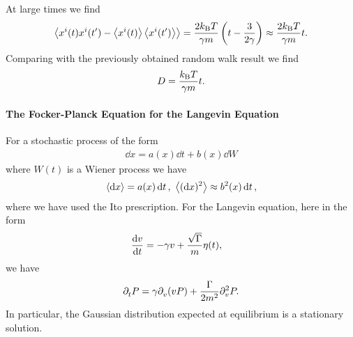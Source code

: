 At large times we find
\begin{align*}
	\expval{x^{i}(t)x^{i}(t\ensuremath{^{\prime}}) - \expval{x^{i}(t)}\expval{x^{i}(t\ensuremath{^{\prime}})}} = \frac{2k_{\text{B}} T}{\gamma m}\left(t - \frac{3}{2\gamma}\right) \approx \frac{2k_{\text{B}} T}{\gamma m}t.
\end{align*}
Comparing with the previously obtained random walk result we find
\begin{align*}
	D = \frac{k_{\text{B}} T}{\gamma m}t.
\end{align*}

\paragraph{The Focker-Planck Equation for the Langevin Equation}
For a stochastic process of the form
\begin{align*}
	\dd{x} = a(x)\dd{t} + b(x)\dd{W}
\end{align*}
where $W(t)$ is a Wiener process we have
\begin{align*}
	\expval{\dd{x}} = a(x)\dd{t},\ \expval{(\dd{x})^{2}} \approx b^{2}(x)\dd{t},
\end{align*}
where we have used the Ito prescription. For the Langevin equation, here in the form
\begin{align*}
	\dv{v}{t} &= -\gamma v + \frac{\sqrt{\Gamma}}{m}\eta(t),
\end{align*}
we have
\begin{align*}
	\partial^{}_{t}P = \gamma\partial^{}_{v}(vP) + \frac{\Gamma}{2m^{2}}\partial^{2}_{v}P.
\end{align*}
In particular, the Gaussian distribution expected at equilibrium is a stationary solution.

